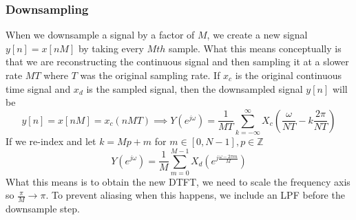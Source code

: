 \documentclass{article}
\begin{document}
\subsubsection{Downsampling}
When we downsample a signal by a factor of $M$, we create a new signal $y[n]=x[nM]$ by taking every $Mth$ sample. What this means conceptually is that we are reconstructing the continuous signal
and then sampling it at a slower rate $MT$ where $T$ was the original sampling rate. If $x_c$ is the original continuous time signal and $x_d$ is the sampled signal, then the downsampled signal $y[n]$
will be
$$y[n]=x[nM]=x_c(nMT)\implies Y(e^{j\omega}) =\frac{1}{MT}\sum_{k=-\infty}^{\infty}X_c\left(\frac{\omega}{NT}-k\frac{2\pi}{NT}\right)$$
If we re-index and let $k=Mp+m$ for $m\in [0, N-1],p\in \mathbb{Z}$
$$Y(e^{j\omega})=\frac{1}{M}\sum_{m=0}^{M-1}X_d(e^{j\frac{\omega-2\pi m}{M}})$$
What this means is to obtain the new DTFT, we need to scale the frequency axis so $\frac{\pi}{M}\rightarrow \pi$.
To prevent aliasing when this happens, we include an LPF before the downsample step.
\begin{figure}[H]
  \centering
\end{figure}
\end{document}
